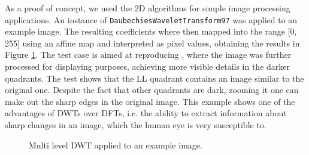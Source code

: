As a proof of concept, we used the 2D algorithms for simple image processing applications. An instance of \texttt{DaubechiesWaveletTransform97} was applied to an example image. The resulting coefficients where then mapped into the range [0, 255] using an affine map and interpreted as pixel values, obtaining the results in Figure \ref{fig:wavelet_2d}. The test case is aimed at reproducing \cite{castle}, where the image was further processed for displaying purposes, achieving more visible details in the darker quadrants. The test shows that the LL quadrant contains an image similar to the original one. Despite the fact that other quadrants are dark, zooming it one can make out the sharp edges in the original image. This example shows one of the advantages of DWTs over DFTs, i.e. the ability to extract information about sharp changes in an image, which the human eye is very susceptible to.

\begin{figure}[h]
    \centering
    \caption{Multi level DWT applied to an example image.}
    \label{fig:wavelet_2d}
\end{figure}

